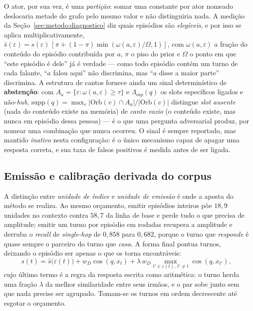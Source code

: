 O ator, por sua vez, é uma \emph{partição}: somar uma constante por ator nomeado
deslocaria metade do grafo pelo mesmo valor e não distinguiria nada. A medição da
Seção~\ref{sec:metodo:diagnostico} diz quais episódios são \emph{elegíveis}, e por
isso se aplica multiplicativamente, $\hat{s}(\varepsilon)=s(\varepsilon)\,
[\pi+(1-\pi)\min(\omega(a,\varepsilon)/\Omega,1)]$, com $\omega(a,\varepsilon)$ a
fração do conteúdo do episódio contribuída por $a$, $\pi$ o piso do prior e
$\Omega$ o ponto em que ``este episódio é dele'' já é verdade --- como todo
episódio contém um turno de cada falante, ``$a$ falou aqui'' não discrimina, mas
``$a$ disse a maior parte'' discrimina. A estrutura de cantos fornece ainda um
sinal determinístico de \textbf{abstenção}: com $A_a=\{\varepsilon:
\omega(a,\varepsilon)\ge\tau\}$ e $\Lambda_{\mathrm{esp}}(q)$ os slots específicos
ligados e não-\emph{hub}, $\mathrm{supp}(q)=\max_{v}|\mathrm{Orb}(v)\cap A_a|/
|\mathrm{Orb}(v)|$ distingue \emph{slot ausente} (nada do conteúdo existe na
memória) de \emph{canto vazio} (o conteúdo existe, mas nunca em episódio dessa
pessoa) --- é o que uma pergunta adversarial produz, por nomear uma combinação que
nunca ocorreu. O sinal é sempre reportado, mas mantido \emph{inativo} nesta
configuração: é o único mecanismo capaz de apagar uma resposta correta, e sua taxa
de falsos positivos é medida antes de ser ligada.

\subsection{Emissão e calibração derivada do corpus}
\label{sec:metodo:emissao}

A distinção entre \emph{unidade de índice} e \emph{unidade de emissão} é onde a
aposta do método se realiza. Ao mesmo orçamento, emitir episódios inteiros põe
$18{,}9$ unidades no contexto contra $58{,}7$ da linha de base e perde tudo o que
precisa de amplitude; emitir um turno por episódio em rodadas recupera a amplitude
e derruba o \emph{recall} de \emph{single-hop} de $0{,}858$ para $0{,}682$, porque
o turno que \emph{responde} é quase sempre o parceiro do turno que \emph{casa}. A
forma final pontua turnos, deixando o episódio ser apenas o que os torna
encontráveis:
\begin{equation}
s(t)=\hat{s}\bigl(\varepsilon(t)\bigr)+w_{D}\cos(q,x_t)
+\lambda\,w_{D}\!\!\max_{t'\in\varepsilon(t),\,t'\neq t}\!\!\cos(q,x_{t'}),
\label{eq:turno}
\end{equation}
cujo último termo é a regra da resposta escrita como aritmética: o turno herda uma
fração $\lambda$ da melhor similaridade entre seus irmãos, e o par sobe junto sem
que nada precise ser agrupado. Tomam-se os turnos em ordem decrescente até esgotar
o orçamento.


